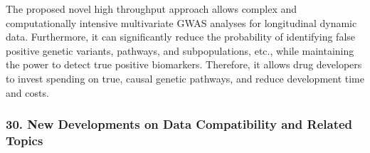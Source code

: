 \begin{itemize}
The proposed novel high throughput approach allows complex and computationally intensive multivariate GWAS analyses for longitudinal dynamic data. Furthermore, it can significantly reduce the probability of identifying false positive genetic variants, pathways, and subpopulations, etc., while maintaining the power to detect true positive biomarkers. Therefore, it allows drug developers to invest spending on true, causal genetic pathways, and reduce development time and costs.

\end{itemize}

\subsubsection*{30. New Developments on Data Compatibility and Related  Topics}

